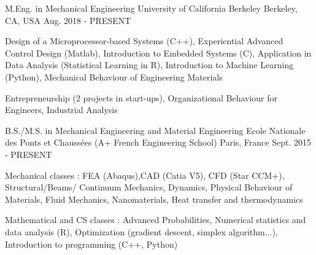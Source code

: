 \begin{cventries}
  \cventry
    {M.Eng. in Mechanical Engineering}
    {University of California Berkeley}
    {Berkeley, CA, USA}
    {Aug. 2018 - PRESENT}
    {\begin{cvitems}
        \item {Design of a Microprocessor-based Systems (C++), Experiential Advanced Control Design (Matlab), Introduction to Embedded Systems (C), Application in Data Analysis (Statistical Learning in R),  Introduction to Machine Learning (Python), Mechanical Behaviour of Engineering Materials}
        \item {Entrepreneurship (2 projects in start-ups), Organizational Behaviour for Engineers, Industrial Analysis}
      \end{cvitems}
    }
  \cventry 
    {B.S./M.S. in Mechanical Engineering and Material Engineering}
    {Ecole Nationale des Ponts et Chaussées (A+ French Engineering School)}
    {Paris, France}
    {Sept. 2015 - PRESENT}
    {\begin{cvitems}
        \item {Mechanical classes : FEA (Abaqus),CAD (Catia V5), CFD (Star CCM+), Structural/Beams/ Continuum Mechanics, Dynamics, Physical Behaviour of Materials, Fluid Mechanics, Nanomaterials, Heat transfer and thermodynamics }
        \item {Mathematical and CS classes : Advanced Probabilities, Numerical statistics and data analysis (R), Optimization (gradient descent, simplex algorithm...), Introduction to programming (C++, Python) }
      \end{cvitems}
    }
    
\end{cventries}

